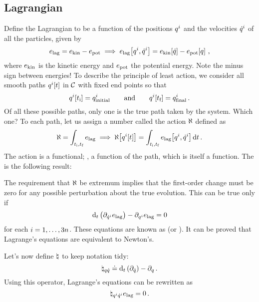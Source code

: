 \subsection{Lagrangian}
%
Define the Lagrangian to be a function of the positions ${q}^{i}$ and the velocities ${\dot{q}}^{i}$ of all the particles, given by
%
\begin{equation}
  e_\text{lag} = e_\text{kin} - e_\text{pot} \implies
  e_\text{lag}\!\left[{{q}^{i}, {\dot{q}}^{i}}\right] = e_\text{kin}\!\left[{\dot{q}}\right] - e_\text{pot}\!\left[{q}\right]\,,
\end{equation}
%
where $e_\text{kin}$ is the kinetic energy and $e_\text{pot}$ the potential energy. Note the minus sign between energies! To describe the principle of least action, we consider all smooth paths ${q}^{i}\!\left[{t}\right]$ in $\mathcal{C}$ with fixed end points so that
%
\begin{equation}
  {q}^{i}\!\left[{t_\text{i}}\right] = {q}^{i}_\text{initial} \qquad\text{and}\qquad
  {q}^{i}\!\left[{t_\text{f}}\right] = {q}^{i}_\text{final}\,.
\end{equation}
%
Of all these possible paths, only one is the true path taken by the system. Which one? To each path, let us assign a number called the action $\aleph$ defined as
%
\begin{equation}
  \aleph = \int_{t_\text{i}, t_\text{f}}{e_\text{lag}} \implies
  \aleph\!\left[{{q}^{i}\!\left[{t}\right]}\right] = \int_{t_\text{i}, t_\text{f}}{e_\text{lag}\!\left[{{q}^{i}, {\dot{q}}^{i}}\right]}\,{\text{d} t}\,.
\end{equation}
%
The action is a functional; \ie, a function of the path, which is itself a function. The  is the following result:
%
\begin{quote}\begin{center}
%
%
\end{center}\end{quote}
%
The requirement that $\aleph$ be extremum implies that the first-order change must be zero for any possible perturbation about the true evolution. This can be true only if
%
\begin{equation}
  \text{d}_{t}\left({\partial_{{{\dot{q}}^{i}}}{e_\text{lag}}}\right) - \partial_{{q}^{i}}{e_\text{lag}} = 0
\end{equation}
%
for each $i = 1,\dotsc,3n$. These equations are known as  (or ). It can be proved that Lagrange's equations are equivalent to Newton's.

Let's now define  $\natural_{{}{}}$ to keep notation tidy:
%
%
\begin{equation}
  \natural_{{q}{\dot{q}}} \doteq \text{d}_{t}\left({\partial_{{\dot{q}}}{}}\right) - \partial_{q}{}\,.
\end{equation}
%
Using this operator, Lagrange's equations can be rewritten as
%
\begin{equation}
  \natural_{{{q}^{i}}{{\dot{q}}^{i}}}e_\text{lag} = 0\,.
\end{equation}


